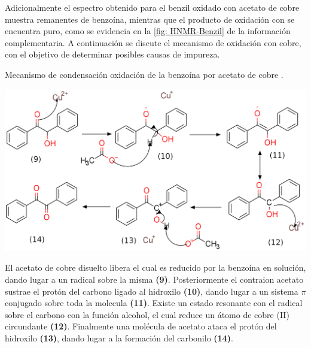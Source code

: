 \documentclass[fleqn,10pt]{SelfArx}
\begin{document}
Adicionalmente el espectro obtenido para el benzil oxidado con acetato de cobre muestra remanentes de benzo\'ina, mientras que el producto de oxidaci\'on con  se encuentra puro, como se evidencia en la \autoref{fig: HNMR-Benzil} de la informaci\'on complementaria. A continuaci\'on se discute el mecanismo de oxidaci\'on con cobre, con el objetivo de determinar posibles causas de impureza. 
\begin{scheme}[h]
	\centering
	\caption{Mecanismo de condensaci\'on oxidaci\'on de la benzo\'ina por acetato de cobre \cite{wigal2000}.}
	\includegraphics[width=\linewidth]{structures/mechanism-oxidationCu.png}
\end{scheme}

El acetato de cobre disuelto libera  el cual es reducido por la benzoina en soluci\'on, dando lugar a un radical sobre la misma \textbf{(9)}. Posteriormente el contraion acetato sustrae el prot\'on del carbono ligado al hidroxilo \textbf{(10)}, dando lugar a un sistema $\pi$ conjugado sobre toda la molecula \textbf{(11)}. Existe un estado resonante con el radical sobre el carbono con la funci\'on alcohol, el cual reduce un \'atomo de cobre (II) circundante \textbf{(12)}. Finalmente una mol\'ecula de acetato ataca el prot\'on del hidroxilo \textbf{(13)}, dando lugar a la formaci\'on del carbonilo \textbf{(14)}.
\end{document}
